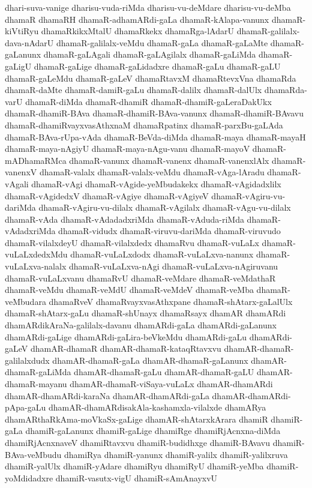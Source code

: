 {dhari-suva-vanige
dharisu-vuda-riMda
dharisu-vu-deMdare
dharisu-vu-deMba
dhamaR
dhamaRH
dhamaR-adhamARdi-gaLa
dhamaR-kAlapa-vanunx
dhamaR-kiVtiRyu
dhamaRkikxMtalU
dhamaRkekx
dhamaRga-lAdarU
dhamaR-galilalx-dava-nAdarU
dhamaR-galilalx-veMdu
dhamaR-gaLa
dhamaR-gaLaMte
dhamaR-gaLanunx
dhamaR-gaLAgali
dhamaR-gaLAgilalx
dhamaR-gaLiMda
dhamaR-gaLigU
dhamaR-gaLige
dhamaR-gaLidadxre
dhamaR-gaLu
dhamaR-gaLU
dhamaR-gaLeMdu
dhamaR-gaLeV
dhamaRtavxM
dhamaRtevxVna
dhamaRda
dhamaR-daMte
dhamaR-damiR-gaLu
dhamaR-dalilx
dhamaR-dalUlx
dhamaRda-varU
dhamaR-diMda
dhamaR-dhamiR
dhamaR-dhamiR-gaLeraDakUkx
dhamaR-dhamiR-BAva
dhamaR-dhamiR-BAva-vanunx
dhamaR-dhamiR-BAvavu
dhamaR-dhamiRvayxvasAthxnaM
dhamaRpatinx
dhamaR-parxBu-gaLAda
dhamaR-BAva-rUpa-vAda
dhamaR-BeVda-diMda
dhamaR-maya
dhamaR-mayaH
dhamaR-maya-nAgiyU
dhamaR-maya-nAgu-vanu
dhamaR-mayoV
dhamaR-mADhamaRMca
dhamaR-vanunx
dhamaR-vanenx
dhamaR-vanenxlAlx
dhamaR-vanenxV
dhamaR-valalx
dhamaR-valalx-veMdu
dhamaR-vAga-lAradu
dhamaR-vAgali
dhamaR-vAgi
dhamaR-vAgide-yeMbudakekx
dhamaR-vAgidadxlilx
dhamaR-vAgidedxV
dhamaR-vAgiye
dhamaR-vAgiyeV
dhamaR-vAgiru-vu-dariMda
dhamaR-vAgiru-vu-dilalx
dhamaR-vAgilalx
dhamaR-vAgu-vu-dilalx
dhamaR-vAda
dhamaR-vAdadadxriMda
dhamaR-vAduda-riMda
dhamaR-vAdadxriMda
dhamaR-vidudx
dhamaR-viruvu-dariMda
dhamaR-viruvudo
dhamaR-vilalxdeyU
dhamaR-vilalxdedx
dhamaRvu
dhamaR-vuLaLx
dhamaR-vuLaLxdedxMdu
dhamaR-vuLaLxdodx
dhamaR-vuLaLxva-nanunx
dhamaR-vuLaLxva-nalalx
dhamaR-vuLaLxva-nAgi
dhamaR-vuLaLxva-nAgiruvanu
dhamaR-vuLaLxvanu
dhamaRvU
dhamaR-veMdare
dhamaR-veMdathaR
dhamaR-veMdu
dhamaR-veMdU
dhamaR-veMdeV
dhamaR-veMba
dhamaR-veMbudara
dhamaRveV
dhamaRvayxvasAthxpane
dhamaR-shAtarx-gaLalUlx
dhamaR-shAtarx-gaLu
dhamaR-shUnayx
dhamaRsayx
dhamAR
dhamARdi
dhamARdikAraNa-galilalx-davanu
dhamARdi-gaLa
dhamARdi-gaLanunx
dhamARdi-gaLige
dhamARdi-gaLira-beVkeMdu
dhamARdi-gaLu
dhamARdi-gaLeV
dhamAR-dhamaR
dhamAR-dhamaR-kataqRtavxvu
dhamAR-dhamaR-galilalxdudx
dhamAR-dhamaR-gaLa
dhamAR-dhamaR-gaLanunx
dhamAR-dhamaR-gaLiMda
dhamAR-dhamaR-gaLu
dhamAR-dhamaR-gaLU
dhamAR-dhamaR-mayanu
dhamAR-dhamaR-viSaya-vuLaLx
dhamAR-dhamARdi
dhamAR-dhamARdi-karaNa
dhamAR-dhamARdi-gaLa
dhamAR-dhamARdi-pApa-gaLu
dhamAR-dhamARdisakAla-kashamxla-vilalxde
dhamARya
dhamARthaRkAma-moVkaSx-gaLige
dhamAR-shAtarxkArara
dhamiR
dhamiR-gaLa
dhamiR-gaLanunx
dhamiR-gaLige
dhamiRge
dhamiRjAcnxna-diMda
dhamiRjAcnxnaveV
dhamiRtavxvu
dhamiR-budidhxge
dhamiR-BAvavu
dhamiR-BAva-veMbudu
dhamiRya
dhamiR-yanunx
dhamiR-yalilx
dhamiR-yalilxruva
dhamiR-yalUlx
dhamiR-yAdare
dhamiRyu
dhamiRyU
dhamiR-yeMba
dhamiR-yoMdidadxre
dhamiR-vasutx-vigU
dhamiR-sAmAnayxvU
}
